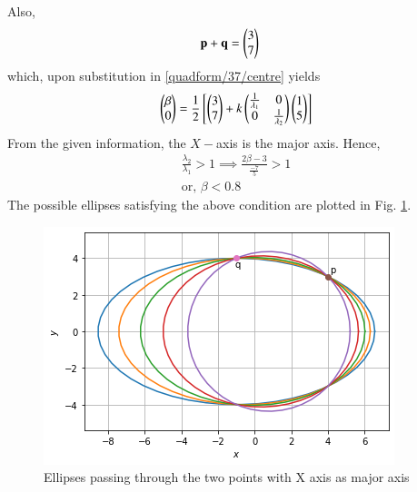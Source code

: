 Also, 
\begin{align}
    \mathbf{p}+\mathbf{q} &= \begin{pmatrix}3 \\ 7\end{pmatrix}
\end{align}
which, upon substitution in     \eqref{quadform/37/centre} yields 
\begin{align}
 \begin{pmatrix}\beta\\0\end{pmatrix}=\frac{1}{2}{}\left[\begin{pmatrix}3\\7\end{pmatrix}+k\begin{pmatrix}\frac{1}{\lambda_1} & 0 \\ 0 & \frac{1}{\lambda_2}\end{pmatrix}\begin{pmatrix}1\\5\end{pmatrix}\right]
\end{align}
From the given information, the $X-$axis is the major axis.  Hence, 
\begin{align}
    \frac{\lambda_2}{\lambda_1}>1
    \implies \frac{2\beta-3}{\frac{-7}{5}}>1\\
    \text{or, } \beta<0.8
\end{align}
%
The possible ellipses satisfying the above condition are plotted in Fig. \ref{quadforms/37/fig:ellipses}.	
\begin{figure}[!ht]
\centering
\includegraphics[width=\columnwidth]{solutions/su2021/2/37/figure5_1.png}
\caption{Ellipses passing through the two points with X axis as major axis}
\label{quadforms/37/fig:ellipses}	
\end{figure}
%
